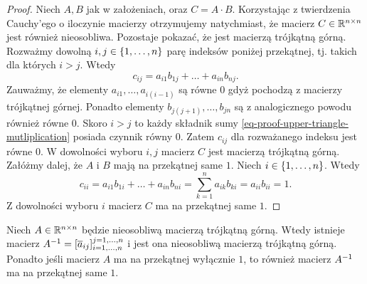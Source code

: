 \documentclass[12pt,a4paper]{report}
\newcommand{\mx}[1]{{#1}}
\begin{document}
\begin{proof}
Niech $\mx{A}, \mx{B}$ jak w założeniach, oraz $\mx{C} = \mx{A} \cdot \mx{B}$. 
Korzystając z twierdzenia Cauchy'ego o iloczynie macierzy otrzymujemy natychmiast, że macierz $\mx{C} \in \setR^{n \times n}$ jest również nieosobliwa. Pozostaje pokazać, że jest macierzą trójkątną górną. Rozważmy dowolną $i,j \in \left\lbrace {1, \ldots, n} \right\rbrace$ parę indeksów poniżej przekątnej, tj. takich dla których $i > j$. Wtedy
\begin{equation}\label{eq-proof-upper-triangle-mutliplication}
c_{ij} = a_{i1} b_{1j} + \ldots +a_{in} b_{nj}.
\end{equation}
Zauważmy, że elementy $a_{i1}, \ldots , a_{i(i-1)}$ są równe $0$ gdyż pochodzą z macierzy trójkątnej górnej. Ponadto elementy $b_{j(j+1)}, \ldots, b_{jn}$ są z analogicznego powodu również równe $0$. Skoro $i > j$ to każdy składnik sumy \eqref{eq-proof-upper-triangle-mutliplication} posiada czynnik równy $0$. Zatem $c_{ij}$ dla rozważanego indeksu jest równe $0$. W dowolności wyboru $i,j$ macierz $\mx{C}$ jest macierzą trójkątną górną. 
Załóżmy dalej, że $\mx{A}$ i $\mx{B}$ mają na przekątnej same $1$. Niech $i \in \left\lbrace {1, \ldots, n} \right\rbrace$. Wtedy 
$$
c_{ii} = a_{i1} b_{1i}+ \ldots+ a_{in} b_{ni} = \sum_{k=1}^{n} a_{ik} b_{ki} = a_{ii}b_{ii} = 1.
$$
Z dowolności wyboru $i$ macierz $\mx{C}$ ma na przekątnej same $1$. 
\end{proof}

\begin{lemma}\label{lemma-upper-triangle-invertion}
Niech $\mx{A} \in \setR^{n \times n}$ będzie nieosobliwą macierzą trójkątną górną. Wtedy istnieje macierz $\inverse{\mx{A}} = [\overline{a}_{ij}]_{i = 1, \ldots , n}^{j = 1, \ldots, n}$ i jest ona nieosobliwą macierzą trójkątną górną. Ponadto jeśli macierz $\mx{A}$ ma na przekątnej wyłącznie $1$, to również macierz $\inverse{\mx{A}}$ ma na przekątnej same $1$.
\end{lemma}
\end{document}
